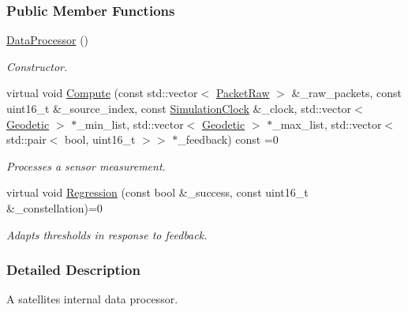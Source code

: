 \subsubsection*{Public Member Functions}
\begin{DoxyCompactItemize}
\item 
\mbox{\label{classosse_1_1collaborate_1_1_data_processor_ac967fe6b10b12e0eede67fc26001202e}} 
\hyperlink{classosse_1_1collaborate_1_1_data_processor_ac967fe6b10b12e0eede67fc26001202e}{Data\+Processor} ()
\begin{DoxyCompactList}\small\item\em Constructor. \end{DoxyCompactList}\item 
virtual void \hyperlink{classosse_1_1collaborate_1_1_data_processor_af984306eb4619e7d5823a7293fe568cb}{Compute} (const std\+::vector$<$ \hyperlink{classosse_1_1collaborate_1_1_packet_raw}{Packet\+Raw} $>$ \&\+\_\+raw\+\_\+packets, const uint16\+\_\+t \&\+\_\+source\+\_\+index, const \hyperlink{classosse_1_1collaborate_1_1_simulation_clock}{Simulation\+Clock} \&\+\_\+clock, std\+::vector$<$ \hyperlink{classosse_1_1collaborate_1_1_geodetic}{Geodetic} $>$ $\ast$\+\_\+min\+\_\+list, std\+::vector$<$ \hyperlink{classosse_1_1collaborate_1_1_geodetic}{Geodetic} $>$ $\ast$\+\_\+max\+\_\+list, std\+::vector$<$ std\+::pair$<$ bool, uint16\+\_\+t $>$$>$ $\ast$\+\_\+feedback) const =0
\begin{DoxyCompactList}\small\item\em Processes a sensor measurement. \end{DoxyCompactList}\item 
virtual void \hyperlink{classosse_1_1collaborate_1_1_data_processor_a4efa75369a65d2a6011093facfcac44a}{Regression} (const bool \&\+\_\+success, const uint16\+\_\+t \&\+\_\+constellation)=0
\begin{DoxyCompactList}\small\item\em Adapts thresholds in response to feedback. \end{DoxyCompactList}\end{DoxyCompactItemize}


\subsubsection{Detailed Description}
A satellite\textquotesingle{}s internal data processor. 

